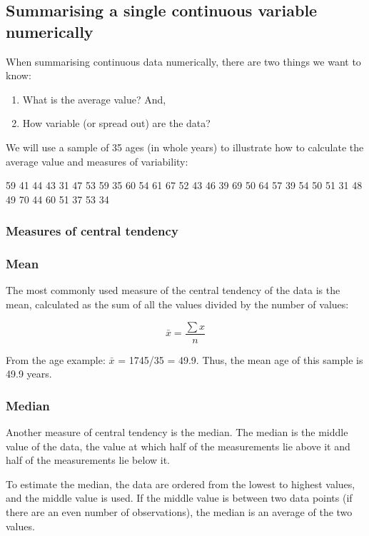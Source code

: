 \documentclass[
  a4paper,
]{memoir}
\providecommand{\tightlist}{%
  \setlength{\itemsep}{0pt}\setlength{\parskip}{0pt}}
\begin{document}
\subsection{Summarising a single continuous variable
numerically}\label{summarising-a-single-continuous-variable-numerically}

When summarising continuous data numerically, there are two things we
want to know:

\begin{enumerate}
\def\labelenumi{\arabic{enumi}.}
\tightlist
\item
  What is the average value? And,
\item
  How variable (or spread out) are the data?
\end{enumerate}

We will use a sample of 35 ages (in whole years) to illustrate how to
calculate the average value and measures of variability:

59 41 44 43 31 47 53 59 35 60 54 61 67 52 43 46 39 69 50 64 57 39 54 50
51 31 48 49 70 44 60 51 37 53 34

\subsubsection{Measures of central
tendency}\label{sec-measures-of-central-tendency}

\subsubsection{Mean}\label{mean}

The most commonly used measure of the central tendency of the data is
the mean, calculated as the sum of all the values divided by the number
of values:

\[\bar{x} = \frac{\sum x}{n}\]

From the age example: \(\bar{x}\) = 1745/35 = 49.9. Thus, the mean age
of this sample is 49.9 years.

\subsubsection{Median}\label{median}

Another measure of central tendency is the median. The median is the
middle value of the data, the value at which half of the measurements
lie above it and half of the measurements lie below it.

To estimate the median, the data are ordered from the lowest to highest
values, and the middle value is used. If the middle value is between two
data points (if there are an even number of observations), the median is
an average of the two values.
\end{document}
